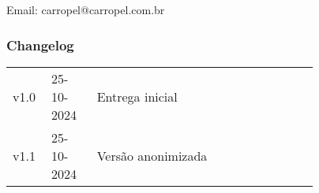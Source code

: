 \documentclass[a4paper, 12pt]{CSSullivanBusinessReport}
\begin{document}
\begin{twothirdswidth}
	Email: carropel@carropel.com.br
	
	\vfill 
	
	\subsubsection*{Changelog}
	
	\scriptsize 
	
	\begin{tabular}{@{} L{0.05\linewidth} L{0.12\linewidth} L{0.6\linewidth} @{}} 
		\toprule
		v1.0 & 25-10-2024 & Entrega inicial \\
            v1.1 & 25-10-2024 & Versão anonimizada \\
		\bottomrule
	\end{tabular}
\end{twothirdswidth}

\newpage


\begin{twothirdswidth} 
	\tableofcontents 
\end{twothirdswidth}

\newpage

\end{document}
